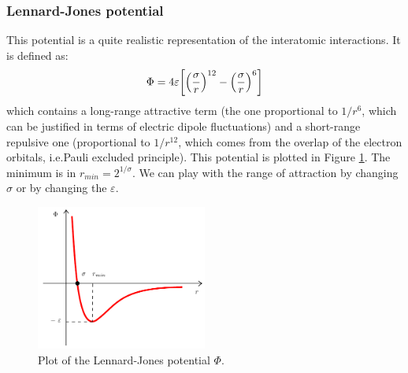 \documentclass[../../Main/Main.tex]{subfiles}
\begin{document}
\subsubsection{Lennard-Jones potential}
This potential is a quite realistic representation of the interatomic interactions. It is defined as:
\begin{equation}
  \Phi = 4 \varepsilon \qty[\qty(\frac{\sigma }{r})^{12} - \qty(\frac{\sigma }{r})^6  ]
\end{equation}
which contains a long-range attractive term (the one proportional to \( 1/r^6 \), which can be justified in terms of electric dipole fluctuations) and a short-range repulsive one (proportional to \( 1/r^{12} \), which comes from the overlap of the electron orbitals, i.e.Pauli excluded principle). This potential is plotted in Figure \ref{fig:15_13}.  The minimum is in \( r_{min}=2^{1/\sigma } \).   We can play with the range of attraction by changing \( \sigma  \) or by changing the   \( \varepsilon  \).


\begin{figure}[H]
\centering
\includegraphics[width=0.5\textwidth]{./img/2__1.pdf}
\caption{\label{fig:15_13} Plot of the Lennard-Jones potential \( \Phi  \).}
\end{figure}
\end{document}

